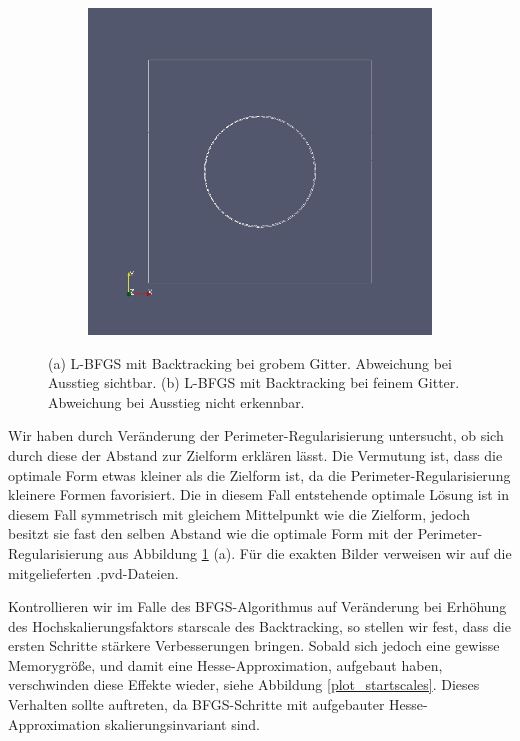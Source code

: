 \begin{figure}
\begin{subfigure}{0.5\textwidth}
	\includegraphics[scale=0.25]{pic_bigcircle_bfgs_linesearch_fine.jpg}
	\caption{}	
	\end{subfigure}
\caption{(a) L-BFGS mit Backtracking bei grobem Gitter. Abweichung bei Ausstieg sichtbar. (b) L-BFGS mit Backtracking bei feinem Gitter. Abweichung bei Ausstieg nicht erkennbar.}
\label{Konvergenzbfgscircle}
\end{figure}

Wir haben durch Veränderung der Perimeter-Regularisierung untersucht, ob sich durch diese der Abstand zur Zielform erklären lässt. Die Vermutung ist, dass die optimale Form etwas kleiner als die Zielform ist, da die Perimeter-Regularisierung kleinere Formen favorisiert. Die in diesem Fall entstehende optimale Lösung ist in diesem Fall symmetrisch mit gleichem Mittelpunkt wie die Zielform, jedoch besitzt sie fast den selben Abstand wie die optimale Form mit der Perimeter-Regularisierung aus Abbildung \ref{Konvergenzbfgscircle} (a). Für die exakten Bilder verweisen wir auf die mitgelieferten \textsf{.pvd}-Dateien.

Kontrollieren wir im Falle des BFGS-Algorithmus auf Veränderung bei Erhöhung des Hochskalierungsfaktors \textsf{starscale} des Backtracking, so stellen wir fest, dass die ersten Schritte stärkere Verbesserungen bringen. Sobald sich jedoch eine gewisse Memorygröße, und damit eine Hesse-Approximation, aufgebaut haben, verschwinden diese Effekte wieder, siehe Abbildung \ref{plot_startscales}. Dieses Verhalten sollte auftreten, da BFGS-Schritte mit aufgebauter Hesse-Approximation skalierungsinvariant sind.

